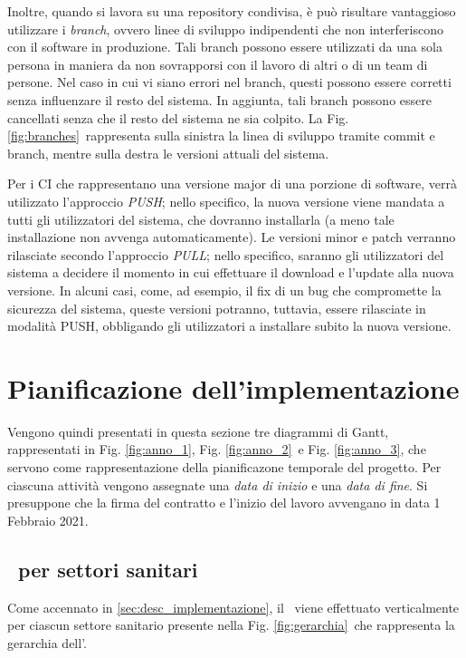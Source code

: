 	Inoltre, quando si lavora su una repository condivisa, è può risultare vantaggioso utilizzare i \textit{branch}, ovvero linee di sviluppo indipendenti che non interferiscono con il software in produzione.
	Tali branch possono essere utilizzati da una sola persona in maniera da non sovrapporsi con il lavoro di altri o di un team di persone.
	Nel caso in cui vi siano errori nel branch, questi possono essere corretti senza influenzare il resto del sistema.
	In aggiunta, tali branch possono essere cancellati senza che il resto del sistema ne sia colpito.
	La Fig. \ref{fig:branches}~rappresenta sulla sinistra la linea di sviluppo tramite commit e branch, mentre sulla destra le versioni attuali del sistema.
	
	Per i CI che rappresentano una versione major di una porzione di software, verrà utilizzato l'approccio \textit{PUSH}; nello specifico, la nuova versione viene mandata a tutti gli utilizzatori del sistema, che dovranno installarla (a meno tale installazione non avvenga automaticamente).
	Le versioni minor e patch verranno rilasciate secondo l'approccio \textit{PULL}; nello specifico, saranno gli utilizzatori del sistema a decidere il momento in cui effettuare il download e l'update alla nuova versione.
	In alcuni casi, come, ad esempio, il fix di un bug che compromette la sicurezza del sistema, queste versioni potranno, tuttavia, essere rilasciate in modalità PUSH, obbligando gli utilizzatori a installare subito la nuova versione.
	
\newpage
\section{Pianificazione dell'implementazione}\label{sec:pianificazione}

	Vengono quindi presentati in questa sezione tre diagrammi di Gantt, rappresentati in Fig. \ref{fig:anno_1}, Fig. \ref{fig:anno_2}~e Fig. \ref{fig:anno_3}, che servono come rappresentazione della pianificazone temporale del progetto.
	Per ciascuna attività vengono assegnate una \textit{data di inizio} e una \textit{data di fine}.
	Si presuppone che la firma del contratto e l'inizio del lavoro avvengano in data 1 Febbraio 2021.
		
	\subsection{\rollout~per settori sanitari}	
	
		Come accennato in \ref{sec:desc_implementazione}, il \rollout~viene effettuato verticalmente per ciascun settore sanitario presente nella Fig. \ref{fig:gerarchia}~che rappresenta la gerarchia dell'\istituto.
		
